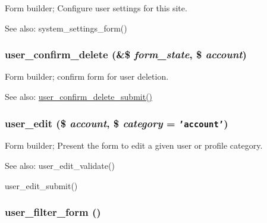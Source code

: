 Form builder; Configure user settings for this site.

\begin{Desc}
\item[See also:]system\_\-settings\_\-form() \end{Desc}
\hypertarget{group__forms_gd250319bfea19c155bc374bad024be1a}{
\subsubsection[{user\_\-confirm\_\-delete}]{\setlength{\rightskip}{0pt plus 5cm}user\_\-confirm\_\-delete (\&\$ {\em form\_\-state}, \/  \$ {\em account})}}
\label{group__forms_gd250319bfea19c155bc374bad024be1a}


Form builder; confirm form for user deletion.

\begin{Desc}
\item[See also:]\hyperlink{user_8pages_8inc_462a20e1dc458d7fd3f0a3214863d46f}{user\_\-confirm\_\-delete\_\-submit()} \end{Desc}
\hypertarget{group__forms_gd1dd92a806e43b841305962c7331818b}{
\subsubsection[{user\_\-edit}]{\setlength{\rightskip}{0pt plus 5cm}user\_\-edit (\$ {\em account}, \/  \$ {\em category} = {\tt 'account'})}}
\label{group__forms_gd1dd92a806e43b841305962c7331818b}


Form builder; Present the form to edit a given user or profile category.

\begin{Desc}
\item[See also:]user\_\-edit\_\-validate() 

user\_\-edit\_\-submit() \end{Desc}
\hypertarget{group__forms_g4492f8566743ff967248ff7d22108a54}{
\subsubsection[{user\_\-filter\_\-form}]{\setlength{\rightskip}{0pt plus 5cm}user\_\-filter\_\-form ()}}
\label{group__forms_g4492f8566743ff967248ff7d22108a54}


